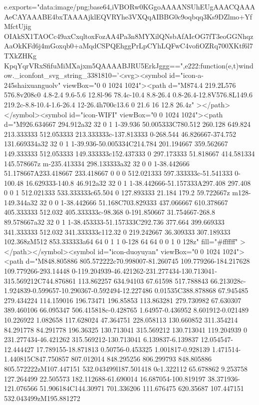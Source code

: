 {e.exports="data:image/png;base64,iVBORw0KGgoAAAANSUhEUgAAACQAAAAeCAYAAABE4bxTAAAAjklEQVRYhe3VXQqAIBBG0c9oqbqq3Ks9DZlmo+YfMfctUjig
OIAkSX1TAOCc49axCxqltoxFozAA4Pa3n8MYXilQNsbAfAIcOG7fT3eoGGNhqzAaOkKFd6j4mGoxqb0+aMqdCSPQEhggPrLpCYhLQFwC4vofiOZRq700XKtf6l7TXkZHKg
KpqYqrVRxSfifuMiMXajxm5QAAAABJRU5ErkJggg=="},e222:function(e,t){window._iconfont_svg_string_3381810='<svg><symbol
id="icon-a-245shaixuanguolv" viewBox="0 0 1024 1024"><path d="M874.4 219.2L576 576.8v208c0 4.8-2.4 9.6-5.6 12.8l-96 78.4c-10.4
8.8-26.4 0.8-26.4-12.8V576.8L149.6 219.2c-8.8-10.4-1.6-26.4 12-26.4h700c13.6 0 21.6 16 12.8 26.4z"  ></path></symbol><symbol
id="icon-WIFI" viewBox="0 0 1024 1024"><path d="M926.634667 294.912a32 32 0 1 1-39.936 50.005333C780.512 260.128 649.824
213.333333 512.053333 213.333333c-137.813333 0-268.544 46.826667-374.752 131.669334a32 32 0 1 1-39.936-50.005334C214.784
201.194667 359.562667 149.333333 512.053333 149.333333c152.437333 0 297.173333 51.818667 414.581334 145.578667z m-235.413334
298.133333a32 32 0 0 1-38.442666 51.178667A233.418667 233.418667 0 0 0 512.021333 597.333333c-51.541333 0-100.48 16.629333-140.8
46.912a32 32 0 1 1-38.442666-51.157333A297.408 297.408 0 0 1 512.021333 533.333333c65.504 0 127.893333 21.184 179.2 59.722667z
m128-149.344a32 32 0 0 1-38.442666 51.168C703.829333 437.066667 610.378667 405.333333 512.032 405.333333c-98.368 0-191.850667
31.754667-268.8 89.578667a32 32 0 1 1-38.453333-51.157333C292.736 377.664 399.669333 341.333333 512.032 341.333333c112.32 0
219.242667 36.309333 307.189333 102.368zM512 853.333333a64 64 0 1 1 0-128 64 64 0 0 1 0 128z" fill="#ffffff"
></path></symbol><symbol id="icon-duoyuyan" viewBox="0 0 1024 1024"><path d="M848.805886 805.572222c70.998007-81.260745
109.779266-184.217628 109.779266-293.14448 0-119.204939-46.421262-231.277434-130.713041-315.569212C744.876861 113.862257
634.94103 67.61598 517.788843 66.213028c-1.924839-0.599657-10.290367-0.592494-12.227486 0.01535C388.878868 67.945485 279.434224
114.159016 196.73471 196.85853 113.863281 279.730982 67.630307 389.460106 66.095347 506.415818c-0.428765 1.64957-0.436952
8.601912-0.021489 10.226922 1.082658 117.628024 47.364751 228.058113 130.660852 311.354214 84.291778 84.291778 196.36325
130.713041 315.569212 130.713041 119.204939 0 231.277434-46.421262 315.569212-130.713041 6.139837-6.139837 12.054547-12.444427
17.789155-18.871813 0.50756-0.453325 1.001817-0.928139 1.471514-1.440815C847.750857 807.012014 848.295256 806.299793 848.805886
805.572222zM107.447151 532.043499l187.501418 0c1.322112 65.678862 9.253758 127.264499 22.505573 182.112688-61.690014
16.687054-100.819197 38.371936-121.076566 51.906184C144.30971 701.336206 111.676475 620.35687 107.447151 532.043499zM195.881272
}
